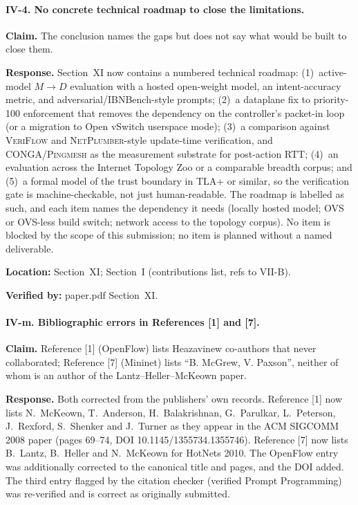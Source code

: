 \documentclass[11pt,a4paper]{article}
\begin{document}
\paragraph{IV-4. No concrete technical roadmap to close the limitations.}

\textbf{Claim.} The conclusion names the gaps but does not say what would be
built to close them.

\textbf{Response.} Section~XI now contains a numbered technical roadmap:
(1)~active-model $M\!\rightarrow\!D$ evaluation with a hosted open-weight
model, an intent-accuracy metric, and adversarial/IBNBench-style prompts;
(2)~a dataplane fix to priority-100 enforcement that removes the dependency on
the controller's packet-in loop (or a migration to Open vSwitch userspace
mode); (3)~a comparison against \textsc{VeriFlow} and
\textsc{NetPlumber}-style update-time verification, and
\textsc{CONGA}/\textsc{Pingmesh} as the measurement substrate for post-action
RTT; (4)~an evaluation across the Internet Topology Zoo or a comparable
breadth corpus; and (5)~a formal model of the trust boundary in TLA+ or
similar, so the verification gate is machine-checkable, not just human-readable.
The roadmap is labelled as such, and each item names the dependency it needs
(locally hosted model; OVS or OVS-less build switch; network access to the
topology corpus). No item is blocked by the scope of this submission; no item
is planned without a named deliverable.

\textbf{Location:} Section~XI; Section~I (contributions list, refs to VII-B).

\textbf{Verified by:} paper.pdf Section~XI.

\paragraph{IV-m. Bibliographic errors in References [1] and [7].}

\textbf{Claim.} Reference [1] (OpenFlow) lists Heazavinew co-authors that
never collaborated; Reference [7] (Mininet) lists ``B. McGrew, V. Paxson'',
neither of whom is an author of the Lantz--Heller--McKeown paper.

\textbf{Response.} Both corrected from the publishers' own records.
Reference [1] now lists N.~McKeown, T.~Anderson, H.~Balakrishnan,
G.~Parulkar, L.~Peterson, J.~Rexford, S.~Shenker and J.~Turner as they
appear in the ACM SIGCOMM 2008 paper (pages 69--74, DOI 10.1145/1355734.1355746).
Reference [7] now lists B.~Lantz, B.~Heller and N.~McKeown for HotNets 2010.
The OpenFlow entry was additionally corrected to the canonical title and
pages, and the DOI added. The third entry flagged by the citation checker
(verified Prompt Programming) was re-verified and is correct as originally
submitted.
\end{document}
